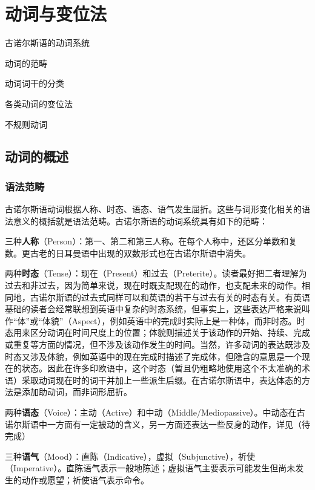 \chapter{动词与变位法}

\begin{introduction}[章节要点]
    \item 古诺尔斯语的动词系统
    \item 动词的范畴
    \item 动词词干的分类
    \item 各类动词的变位法
    \item 不规则动词
\end{introduction}

\section{动词的概述}\label{sec:verb-intro}
\subsection{语法范畴}
古诺尔斯语动词根据人称、时态、语态、语气发生屈折。这些与词形变化相关的语法意义的概括就是语法范畴。古诺尔斯语的动词系统具有如下的范畴：

三种\textbf{人称}（Person）：第一、第二和第三人称。在每个人称中，还区分单数和复数。更古老的日耳曼语中出现的双数形式也在古诺尔斯语中消失。

两种\textbf{时态}（Tense）：现在（Present）和过去（Preterite）。读者最好把二者理解为过去和非过去，因为简单来说，现在时既支配现在的动作，也支配未来的动作。相同地，古诺尔斯语的过去式同样可以和英语的若干与过去有关的时态有关。有英语基础的读者会经常联想到英语中复杂的时态系统，但事实上，这些表达严格来说叫作``体''或``体貌''（Aspect），例如英语中的完成时实际上是一种体，而非时态。时态用来区分动词在时间尺度上的位置；体貌则描述关于该动作的开始、持续、完成或重复等方面的情况，但不涉及该动作发生的时间。当然，许多动词的表达既涉及时态又涉及体貌，例如英语中的现在完成时描述了完成体，但隐含的意思是一个现在的状态。因此在许多印欧语中，这个时态（暂且仍粗略地使用这个不太准确的术语）采取动词现在时的词干并加上一些派生后缀。在古诺尔斯语中，表达体态的方法是添加助动词，而非词形屈折。

两种\textbf{语态}（Voice）：主动（Active）和中动（Middle/Mediopassive）。中动态在古诺尔斯语中一方面有一定被动的含义，另一方面还表达一些反身的动作，详见（待完成）

三种\textbf{语气}（Mood）：直陈（Indicative），虚拟（Subjunctive），祈使（Imperative）。直陈语气表示一般地陈述；虚拟语气主要表示可能发生但尚未发生的动作或愿望；祈使语气表示命令。

